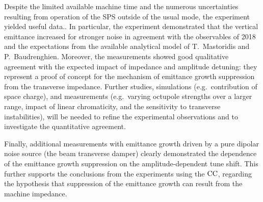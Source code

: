 Despite the limited available machine time and the numerous uncertainties resulting from operation of the SPS outside of the usual mode, the experiment yielded useful data.. In particular, the experiment demonstrated that the vertical emittance increased for stronger noise in agreement with the observables of 2018 and the expectations from the available analytical model of T.~Mastoridis and P.~Baudrenghien. Moreover, the measurements showed good qualitative agreement with the expected impact of impedance and amplitude detuning: they represent a proof of concept for the mechanism of emittance growth suppression from the transverse impedance. Further studies, simulations (e.g.~contribution of space charge), and measurements (e.g.~varying octupole strengths over a larger range, impact of linear chromaticity, and the sensitivity to transverse instabilities), will be needed to refine the experimental observations and to investigate the quantitative agreement. 

Finally, additional measurements with emittance growth driven by a pure dipolar noise source (the beam transverse damper) clearly demonstrated the dependence of the emittance growth suppression on the amplitude-dependent tune shift.  This further supports the conclusions from the experiments using the ${\mathrm{CC}}$, regarding the hypothesis that suppression of the emittance growth can result from the machine impedance.




